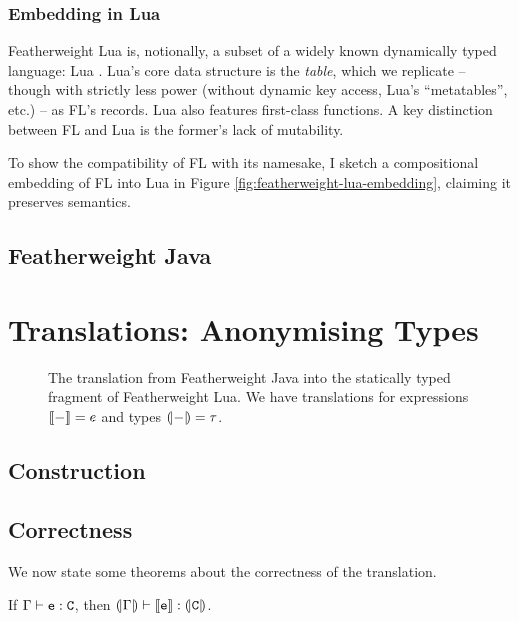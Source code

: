 \subsubsection{Embedding in Lua}
Featherweight Lua is, notionally, a subset of a widely known dynamically typed language: Lua \cite{lua54}.
Lua's core data structure is the \emph{table}, which we replicate -- though with strictly less power (without dynamic key access, Lua's ``metatables'', etc.) -- as FL's records. 
Lua also features first-class functions.
A key distinction between FL and Lua is the former's lack of mutability. 

To show the compatibility of FL with its namesake, I sketch a compositional embedding of FL into Lua in Figure \ref{fig:featherweight-lua-embedding}, claiming it preserves semantics.

\subsection{Featherweight Java}
\label{subsec:featherweight-java}


\section{Translations: Anonymising Types}
\label{sec:translations}


\begin{figure}
    \centering
    
    \caption{The translation from Featherweight Java into the statically typed fragment of Featherweight Lua. We have translations for expressions $\denot{-} = e$ and types $\denoty{-} = \tau$.}
    \label{fig:translation}
\end{figure}

\subsection{Construction}


\subsection{Correctness}

We now state some theorems about the correctness of the translation.

\begin{theorem}
    If $\Gamma \vdash \texttt{e} : \texttt{C}$, then $\denoty{\Gamma} \vdash \denot{\fj e} : \denoty{\fj C}$. 
\end{theorem}

